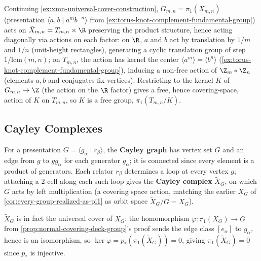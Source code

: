 \begin{example}
\label{ex:gmn-action-on-tree}
Continuing \cref{ex:xmn-universal-cover-construction}, $G_{m,n} = \pi_1(X_{m,n})$
(presentation $\langle a,b\mid a^mb^{-n}\rangle$ from \cref{ex:torus-knot-complement-fundamental-group})
acts on $\tilde X_{m,n} = T_{m,n}\times\R$ preserving the product structure, hence
acting diagonally via actions on each factor: on $\R$, $a$ and $b$ act by
translation by $1/m$ and $1/n$ (unit-height rectangles), generating a cyclic
translation group of step $1/\mathrm{lcm}(m,n)$; on $T_{m,n}$, the action has kernel
the center $\langle a^m\rangle = \langle b^n\rangle$ (\cref{ex:torus-knot-complement-fundamental-group}),
inducing a non-free action of $\Z_m*\Z_n$ (elements $a,b$ and conjugates fix
vertices). Restricting to the kernel $K$ of $G_{m,n}\to\Z$ (the action on the $\R$
factor) gives a free, hence covering-space, action of $K$ on $T_{m,n}$, so $K$ is a
free group, $\pi_1(T_{m,n}/K)$.
\end{example}

\subsection*{Cayley Complexes}

\begin{definition}
\label{def:cayley-graph-and-complex}
For a presentation $G = \langle g_\alpha \mid r_\beta\rangle$, the \textbf{Cayley graph} has
vertex set $G$ and an edge from $g$ to $gg_\alpha$ for each generator $g_\alpha$; it is
connected since every element is a product of generators. Each relator $r_\beta$
determines a loop at every vertex $g$; attaching a 2-cell along each such loop gives
the \textbf{Cayley complex} $\tilde X_G$, on which $G$ acts by left multiplication (a
covering space action, matching the earlier $X_G$ of
\cref{cor:every-group-realized-as-pi1} as orbit space $\tilde X_G/G = X_G$).
\end{definition}

$\tilde X_G$ is in fact the universal cover of $X_G$: the homomorphism
$\varphi:\pi_1(X_G)\to G$ from \cref{prop:normal-covering-deck-group}'s proof sends the
edge class $[e_\alpha]$ to $g_\alpha$, hence is an isomorphism, so
$\ker\varphi = p_*(\pi_1(\tilde X_G)) = 0$, giving $\pi_1(\tilde X_G)=0$ since $p_*$ is
injective.

